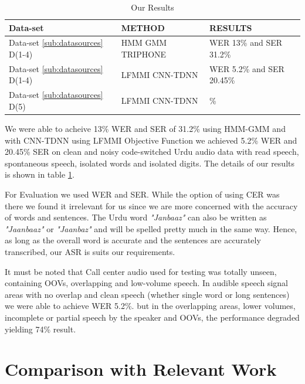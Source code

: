 \begin{table}[h!]
    \centering
    \caption{Our Results} 
    \label{tab:our_result}

    \begin{tabularx}{\textwidth} { 
  | >{\raggedright\arraybackslash}X 
  | >{\raggedright\arraybackslash}X 
  | >{\raggedright\arraybackslash}X | }
    \hline
    \textbf{Data-set} & \textbf{METHOD} & \textbf{RESULTS} \\
    \hline
    Data-set \ref{sub:datasources} D(1-4) & HMM GMM TRIPHONE & WER 13\% and SER 31.2\%  \\ 
    \hline
    Data-set \ref{sub:datasources} D(1-4) & LFMMI CNN-TDNN & WER 5.2\% and SER 20.45\%  \\
    \hline
    Data-set \ref{sub:datasources} D(5) & LFMMI CNN-TDNN & 5.2\%\\   
    \hline
    \end{tabularx}    
\end{table}

We were able to acheive 13\% WER and SER of 31.2\% using HMM-GMM and with CNN-TDNN using LFMMI Objective Function we achieved 5.2\% WER and 20.45\% SER on clean and noisy code-switched Urdu audio data with read speech, spontaneous speech, isolated words and isolated digits. The details of our results is shown in table \ref{tab:our_result}. 

For Evaluation we used WER and SER. While the option of using CER was there we found it irrelevant for us since we are more concerned with the accuracy of words and sentences. The Urdu word \textit{"Janbaaz"} can also be written as \textit{"Jaanbaaz"} or \textit{"Jaanbaz"} and will be spelled pretty much in the same way. Hence, as long as the overall word is accurate and the sentences are accurately transcribed, our ASR is suits our requirements.

It must be noted that Call center audio used for testing was totally unseen, containing OOVs, overlapping and low-volume speech. In audible speech signal areas with no overlap and clean speech (whether single word or long sentences) we were able to achieve WER 5.2\%. but in the overlapping areas, lower volumes, incomplete or partial speech by the speaker and OOVs, the performance degraded yielding 74\% result. 

\section{Comparison with Relevant Work} %
\label{sec:comparison_result}

